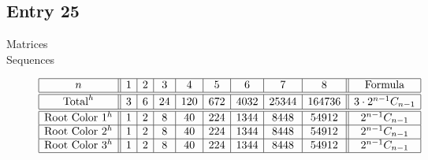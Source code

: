 \documentclass[12pt]{amsart}
\begin{document}
\subsection*{Entry 25}
\begin{description}
    \item[Matrices]\hspace*{\fill}
    
    \item[Sequences]\hspace*{\fill}\vspace{-0.5cm}
    \begin{center}
        \[
        \begin{array}{|c||c|c|c|c|c|c|c|c||c|}\hline
           n  & 1 & 2 & 3 & 4 & 5 & 6 & 7 & 8  & \text{Formula}\\\hline\hline
           \text{Total}^{h}  & 3 & 6 & 24 & 120 & 672 & 4032 & 25344 & 164736 & 3\cdot 2^{n-1}C_{n-1}\\\hline\hline
           \text{Root Color }1^h & 1 & 2 & 8 & 40 & 224 & 1344 & 8448 & 54912 & 2^{n-1}C_{n-1}\\\hline
           \text{Root Color }2^h & 1 & 2 & 8 & 40 & 224 & 1344 & 8448 & 54912 & 2^{n-1}C_{n-1}\\\hline
           \text{Root Color }3^h & 1 & 2 & 8 & 40 & 224 & 1344 & 8448 & 54912 & 2^{n-1}C_{n-1}\\\hline
        \end{array}
        \]
    \end{center}
    

\end{description}
\end{document}
